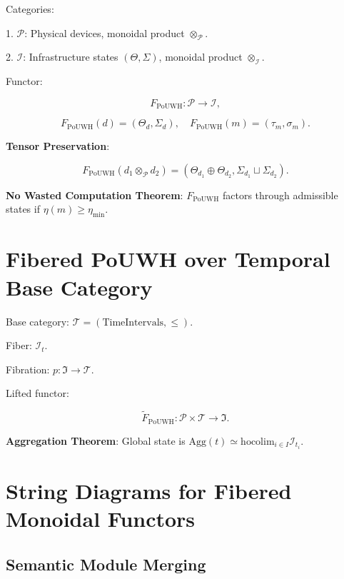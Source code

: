 \documentclass[12pt]{article}
\begin{document}
Categories:

1. $ \mathcal{P} $: Physical devices, monoidal product $ \otimes_{\mathcal{P}} $.

2. $ \mathcal{I} $: Infrastructure states $ (\Theta, \Sigma) $, monoidal product $ \otimes_{\mathcal{I}} $.

Functor:

\[ F_{\mathrm{PoUWH}}: \mathcal{P} \to \mathcal{I}, \]

\[ F_{\mathrm{PoUWH}}(d) = (\Theta_d, \Sigma_d), \quad F_{\mathrm{PoUWH}}(m) = (\tau_m, \sigma_m). \]

\textbf{Tensor Preservation}:

\[ F_{\mathrm{PoUWH}}(d_1 \otimes_{\mathcal{P}} d_2) = (\Theta_{d_1} \oplus \Theta_{d_2}, \Sigma_{d_1} \sqcup \Sigma_{d_2}). \]

\textbf{No Wasted Computation Theorem}: $ F_{\mathrm{PoUWH}} $ factors through admissible states if $ \eta(m) \geq \eta_{\min} $.

\section{Fibered PoUWH over Temporal Base Category}
\label{app:fibered-pouwh}

Base category: $ \mathcal{T} = (\text{TimeIntervals}, \leq) $.

Fiber: $ \mathcal{I}_t $.

Fibration: $ p: \mathfrak{I} \to \mathcal{T} $.

Lifted functor:

\[ \widetilde{F}_{\mathrm{PoUWH}}: \mathcal{P} \times \mathcal{T} \to \mathfrak{I}. \]

\textbf{Aggregation Theorem}: Global state is $ \mathrm{Agg}(t) \simeq \mathrm{hocolim}_{i \in I} \mathcal{I}_{t_i} $.

\section{String Diagrams for Fibered Monoidal Functors}
\label{app:string-diagrams}

\subsection{Semantic Module Merging}

\end{document}
